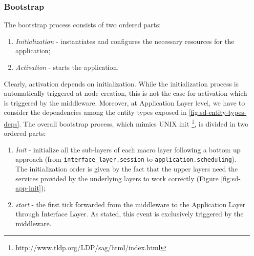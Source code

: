 \subsubsection{Bootstrap}
The bootstrap process consists of two ordered parts:
\begin{enumerate}
	\item \textit{Initialization} - instantiates and configures the necessary resources for the application;
	\item \textit{Activation} - starts the application.
\end{enumerate}
Clearly, activation depends on initialization.
While the initialization process is automatically triggered at node
creation, this is not the case for activation which is triggered by
the middleware.
Moreover, at Application Layer level, we have to consider the
dependencies among the entity types exposed in \ref{fig:sd-entity-types-deps}.
The overall bootstrap process, which mimics UNIX init
\footnote{http://www.tldp.org/LDP/sag/html/index.html},
is divided in two ordered parts:
\begin{enumerate}
	\item \textit{Init} - initialize all the sub-layers of each macro layer
	following a bottom up approach (from \verb|interface_layer.session| to
	\verb|application.scheduling|).
	The initialization order is given by the fact that the upper
	layers need the services provided by the underlying layers to work
	correctly (Figure \ref{fig:sd-app-init});
	\item \textit{start} - the first tick forwarded from the middleware to the
	Application Layer through Interface Layer. As stated, this event is
	exclusively triggered by the middleware.
\end{enumerate}

